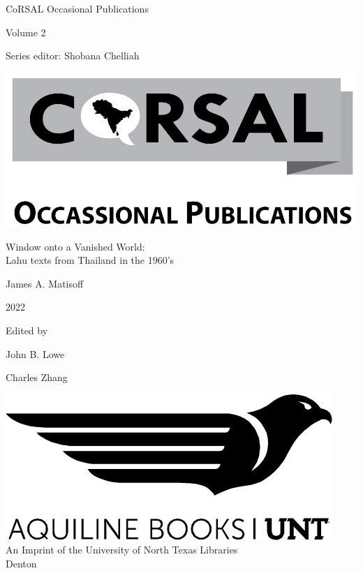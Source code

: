 \thispagestyle{empty}
\begin{center}

\vspace{4cm}
{\Large CoRSAL Occasional Publications}

\vspace{2cm}

{\Large Volume 2}

\vspace{8cm}

Series editor: Shobana Chelliah

\includegraphics[scale=0.15]{CoRSAL-Logo-BW-v03.png}

\end{center}
\clearpage{\thispagestyle{empty}\cleardoublepage}
\begin{center}
\thispagestyle{empty}
\vspace{4cm}
{\huge Window onto a Vanished World:\\\vspace{.75em}Lahu texts from Thailand in the 1960’s}

\vspace{3cm}

{\Large James A. Matisoff}
\vspace{2cm}

2022

\vspace{2cm}

Edited by

John B. Lowe

Charles Zhang

\vspace{4cm}
\includegraphics[scale=1]{AquilineBooksUNT.png}\\
\vspace{1cm}
An Imprint of the University of North Texas Libraries\\
\vspace{1cm}
Denton
\end{center}

